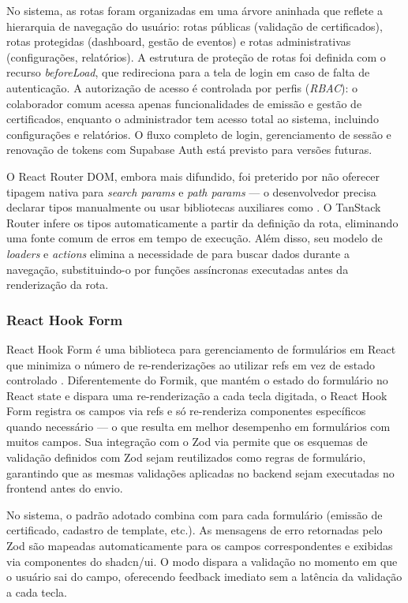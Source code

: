 No sistema, as rotas foram organizadas em uma árvore aninhada que reflete a hierarquia de navegação do usuário: rotas públicas (validação de certificados), rotas protegidas (dashboard, gestão de eventos) e rotas administrativas (configurações, relatórios). A estrutura de proteção de rotas foi definida com o recurso \textit{beforeLoad}, que redireciona para a tela de login em caso de falta de autenticação. A autorização de acesso é controlada por perfis (\textit{RBAC}): o colaborador comum acessa apenas funcionalidades de emissão e gestão de certificados, enquanto o administrador tem acesso total ao sistema, incluindo configurações e relatórios. O fluxo completo de login, gerenciamento de sessão e renovação de tokens com Supabase Auth está previsto para versões futuras.

O React Router DOM, embora mais difundido, foi preterido por não oferecer tipagem nativa para \textit{search params} e \textit{path params} — o desenvolvedor precisa declarar tipos manualmente ou usar bibliotecas auxiliares como . O TanStack Router infere os tipos automaticamente a partir da definição da rota, eliminando uma fonte comum de erros em tempo de execução. Além disso, seu modelo de \textit{loaders} e \textit{actions} elimina a necessidade de  para buscar dados durante a navegação, substituindo-o por funções assíncronas executadas antes da renderização da rota.

\subsubsection{React Hook Form}
React Hook Form é uma biblioteca para gerenciamento de formulários em React que minimiza o número de re-renderizações ao utilizar refs em vez de estado controlado \cite{reacthookform2025}. Diferentemente do Formik, que mantém o estado do formulário no React state e dispara uma re-renderização a cada tecla digitada, o React Hook Form registra os campos via refs e só re-renderiza componentes específicos quando necessário — o que resulta em melhor desempenho em formulários com muitos campos. Sua integração com o Zod via  permite que os esquemas de validação definidos com Zod sejam reutilizados como regras de formulário, garantindo que as mesmas validações aplicadas no backend sejam executadas no frontend antes do envio.

No sistema, o padrão adotado combina  com  para cada formulário (emissão de certificado, cadastro de template, etc.). As mensagens de erro retornadas pelo Zod são mapeadas automaticamente para os campos correspondentes e exibidas via componentes  do shadcn/ui. O modo  dispara a validação no momento em que o usuário sai do campo, oferecendo feedback imediato sem a latência da validação a cada tecla.


